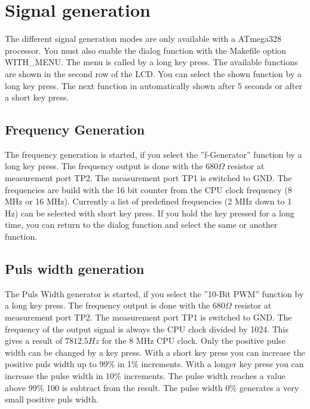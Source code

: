 \chapter{Signal generation}

The different signal generation modes are only available with a ATmega328 processor.
You must also enable the dialog function with the Makefile option WITH\_MENU.
The menu is called by a long key press. The available functions are shown in the
second row of the LCD. You can select the shown function by a long key press.
The next function in automatically shown after 5 seconds or after a short key press.

\label{sec:generation}
\section{Frequency Generation}
The frequency generation is started, if you select the ''f-Generator'' function by
a long key press.
The frequency output is done with the \(680\Omega\) resistor at measurement port TP2.
The measurement port TP1 is switched to GND.
The frequencies are build with the 16 bit counter from the CPU clock frequency 
(8 MHz or 16 MHz).
Currently a list of predefined frequencies (2 MHz down to 1 Hz) can be selected with short key press.
If you hold the key pressed for a long time, you can return to the dialog function and select
the same or another function.

\section{Puls width generation}
The Puls Width generator is started, if you select the ''10-Bit PWM'' function by
a long key press.
The frequency output is done with the \(680\Omega\) resistor at measurement port TP2.
The measurement port TP1 is switched to GND.
The frequency of the output signal is always the CPU clock divided by 1024.
This gives a result of \(7812.5 Hz\) for the 8 MHz CPU clock.
Only the positive pulse width can be changed by a key press. With a short key press
you can increase the positive puls width up to 99\% in 1\% increments.
With a longer key press you can increase the pulse width in 10\% increments.
The pulse width reaches a value above 99\% 100 is subtract from the result.
The pulse width 0\% generates a very small positive puls width.

